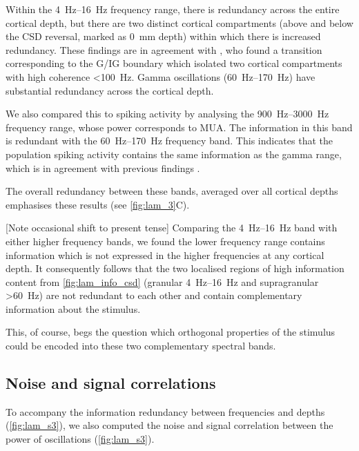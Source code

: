 Within the \SIrange{4}{16}{Hz} frequency range, there is redundancy across the entire cortical depth, but there are two distinct cortical compartments (above and below the \ac{CSD} reversal, marked as \SI{0}{mm} depth) within which there is increased redundancy.
These findings are in agreement with \citet{Maier2010}, who found a transition corresponding to the \ac{G}/\ac{IG} boundary which isolated two cortical compartments with high coherence \SI{<100}{Hz}.
Gamma oscillations (\SIrange{60}{170}{Hz}) have substantial redundancy across the cortical depth.

We also compared this to spiking activity by analysing the  \SIrange{900}{3000}{Hz} frequency range, whose power corresponds to \ac{MUA}. The information in this  band is redundant with the \SIrange{60}{170}{Hz} frequency band.
This indicates that the population spiking activity contains the same information as the gamma range, which is in agreement with previous findings \citep{Belitski2008}.

The overall redundancy between these bands, averaged over all cortical depths emphasises these results (see \autoref{fig:lam_3}C).

[Note occasional shift  to present tense]
Comparing the \SIrange{4}{16}{Hz} band with either higher frequency bands, we found the lower frequency range contains information which is not expressed in the higher frequencies at any cortical depth.
It consequently follows that the two localised regions of high information content from \autoref{fig:lam_info_csd} (granular \SIrange{4}{16}{Hz} and supragranular \SI{>60}{Hz}) are not redundant to each other and contain complementary information about the stimulus.

This, of course, begs the question which orthogonal properties of the stimulus could be encoded into these two complementary spectral bands.


\subsection{Noise and signal correlations}

To accompany the information redundancy between frequencies and depths (\autoref{fig:lam_s3}), we also computed the noise and signal correlation between the power of oscillations (\autoref{fig:lam_s3}).

